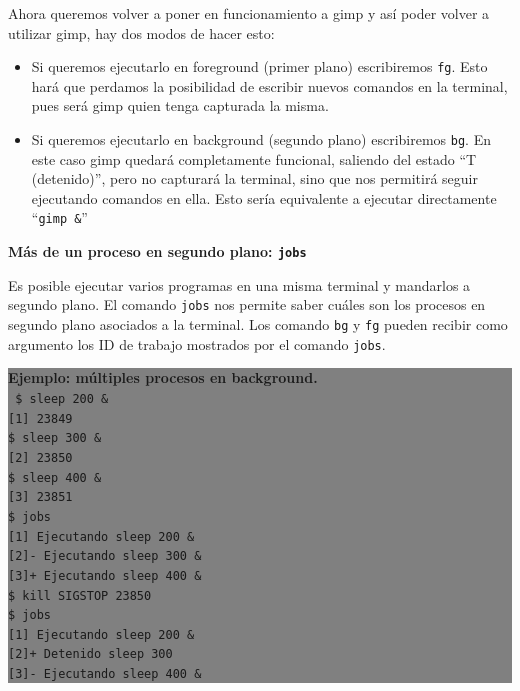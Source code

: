 \documentclass[12pt]{article}
\begin{document}
Ahora queremos volver a poner en funcionamiento a gimp y así poder volver a utilizar gimp, hay dos modos de hacer esto: 

\begin{itemize}
\item Si queremos ejecutarlo en foreground  (primer plano) escribiremos 
\texttt{fg}.
Esto hará que perdamos la posibilidad de escribir nuevos comandos en la 
terminal, pues será gimp quien tenga capturada la misma. 

\item Si queremos ejecutarlo en background (segundo plano) escribiremos 
\texttt{bg}. En este caso gimp quedará completamente funcional, saliendo 
del estado ``T (detenido)'', pero no capturará la terminal, sino que 
nos permitirá seguir ejecutando comandos en ella. Esto sería equivalente
a ejecutar directamente ``\texttt{gimp \&}''
\end{itemize}

{\bf Más de un proceso en segundo plano: \texttt{jobs}}

Es posible ejecutar varios programas en una misma terminal y mandarlos a 
segundo plano. El comando \texttt{jobs} nos permite saber cuáles son los 
procesos en segundo plano asociados a la terminal. Los comando \texttt{bg}
y \texttt{fg} pueden recibir como argumento los ID de trabajo mostrados
por el comando \texttt{jobs}.


\colorbox{grey}{\parbox[t]{0.95\linewidth}{ \vspace*{0.5cm} { 
{\bf Ejemplo: múltiples procesos en background. }\\
{\tt
\$ sleep 200 \& \\
{[}1{]} 23849 \\
\$ sleep 300 \& \\
{[}2{]} 23850\\
\$ sleep 400 \& \\
{[}3{]} 23851 \\
\$ jobs \\
{[}1{]}   Ejecutando              sleep 200 \& \\
{[}2{]}-  Ejecutando              sleep 300 \& \\
{[}3{]}+  Ejecutando              sleep 400 \& \\
\$ kill \-SIGSTOP 23850 \\
\$ jobs \\
{[}1{]}   Ejecutando              sleep 200 \& \\
{[}2{]}+  Detenido                sleep 300 \\
{[}3{]}-  Ejecutando              sleep 400 \& \\
}
} \vspace*{0.5cm} } } 
\end{document}
